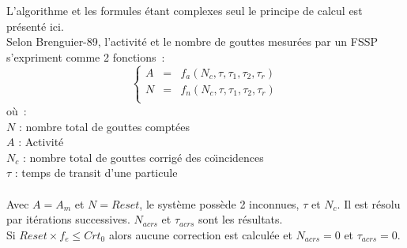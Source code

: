 L'algorithme et les formules \'etant complexes
seul le principe de calcul est pr\'esent\'e ici.\\
Selon Brenguier-89, l'activit\'e
et le nombre de gouttes mesur\'ees par un FSSP
s'expriment comme 2 fonctions~: \\ 
$$
\left\{
\begin{array}{rcl}
A & = & f_a ( N_c, \tau, \tau_1, \tau_2, \tau_r ) \\
N & = & f_n ( N_c, \tau, \tau_1, \tau_2, \tau_r ) \\
\end{array}
\right.
$$
o\`u~:\\
$N $ : nombre total de gouttes compt\'ees \\
$A $ : Activit\'e \\
$N_c$ : nombre total de gouttes corrig\'e des
co\"{\i}ncidences \\
$\tau $ : temps de transit d'une particule \\
\\
Avec $A=A_m$ et $N=Reset$, le syst\`eme poss\`ede 2
inconnues, $\tau$ et $N_c$. Il est
r\'esolu par it\'erations successives. $N_{acrs}$
et $\tau_{acrs}$ sont les r\'esultats.\\ 
Si $Reset\times f_e \le Crt_0$ alors aucune correction
est calcul\'ee et $N_{acrs}=0$ et $\tau_{acrs}=0$.

